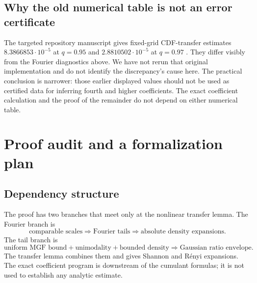 \documentclass[11pt,a4paper]{article}
\numberwithin{equation}{section}
\theoremstyle{definition}
\theoremstyle{remark}
\begin{document}
\subsection{Why the old numerical table is not an error certificate}

The targeted repository manuscript gives fixed-grid CDF-transfer estimates
$8.3866853\cdot10^{-5}$ at $q=0.95$ and
$2.8810502\cdot10^{-5}$ at $q=0.97$ \cite{repo}.
They differ visibly from the Fourier diagnostics above. We have not rerun that
original implementation and do not identify the discrepancy's cause here.
The practical conclusion is narrower: those earlier displayed values should
not be used as certified data for inferring fourth and higher coefficients.
The exact coefficient calculation and the proof of the remainder do not depend
on either numerical table.

\section{Proof audit and a formalization plan}
\label{sec:audit}

\subsection{Dependency structure}

The proof has two branches that meet only at the nonlinear transfer lemma.
The Fourier branch is
\[
 \text{comparable scales}
 \Longrightarrow\text{Fourier tails}
 \Longrightarrow\text{absolute density expansions}.
\]
The tail branch is
\[
 \text{uniform MGF bound}+\text{unimodality}+\text{bounded density}
 \Longrightarrow\text{Gaussian ratio envelope}.
\]
The transfer lemma combines them and gives Shannon and R\'enyi expansions.
The exact coefficient program is downstream of the cumulant formulas; it is
not used to establish any analytic estimate.
\end{document}

